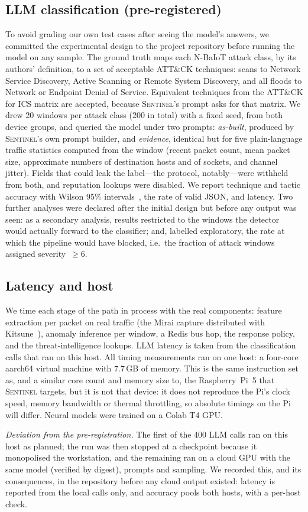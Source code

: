 \subsection{LLM classification (pre-registered)}
To avoid grading our own test cases after seeing the model's answers, we
committed the experimental design to the project repository before running the
model on any sample. The ground truth maps each N-BaIoT attack class, by its
authors' definition, to a set of acceptable ATT\&CK techniques: scans to
Network Service Discovery, Active Scanning or Remote System Discovery, and all
floods to Network or Endpoint Denial of Service. Equivalent techniques from the
ATT\&CK for ICS matrix are accepted, because \textsc{Sentinel}'s prompt asks
for that matrix. We drew 20 windows per attack class (200 in total) with a fixed
seed, from both device groups, and queried the model under two prompts:
\emph{as-built}, produced by \textsc{Sentinel}'s own prompt builder, and
\emph{evidence}, identical but for five plain-language traffic statistics
computed from the window (recent packet count, mean packet size, approximate
numbers of destination hosts and of sockets, and channel jitter). Fields that
could leak the label---the protocol, notably---were withheld from both, and
reputation lookups were disabled. We report technique and tactic accuracy with
Wilson 95\% intervals~\cite{wilson1927}, the rate of valid JSON, and latency.
Two further analyses were declared after the initial design but before any
output was seen: as a secondary analysis, results restricted to the windows the
detector would actually forward to the classifier; and, labelled exploratory,
the rate at which the pipeline would have blocked, i.e.\ the fraction of
attack windows assigned severity~$\geq 6$.

\subsection{Latency and host}
We time each stage of the path in process with the real components: feature
extraction per packet on real traffic (the Mirai capture distributed with
Kitsune~\cite{kitsunepy}), anomaly inference per window, a Redis bus hop, the
response policy, and the threat-intelligence lookups. LLM latency is taken from
the \NllmLatN{} classification calls that ran on this host. All timing
measurements ran on one host: a four-core
aarch64 virtual machine with 7.7\,GB of memory. This is the same instruction
set as, and a similar core count and memory size to, the Raspberry~Pi~5 that
\textsc{Sentinel} targets, but it is not that device: it does not reproduce the
Pi's clock speed, memory bandwidth or thermal throttling, so absolute timings
on the Pi will differ. Neural models were trained on a Colab T4 GPU.

\emph{Deviation from the pre-registration.} The first \NllmLocN{} of the
400 LLM calls ran on this host as planned; the run was then stopped at a
checkpoint because it monopolised the workstation, and the remaining
\NllmCloudN{} ran on a cloud GPU with the same model (verified by digest),
prompts and sampling. We recorded this, and its consequences, in the
repository before any cloud output existed: latency is reported from the
local calls only, and accuracy pools both hosts, with a per-host check.
